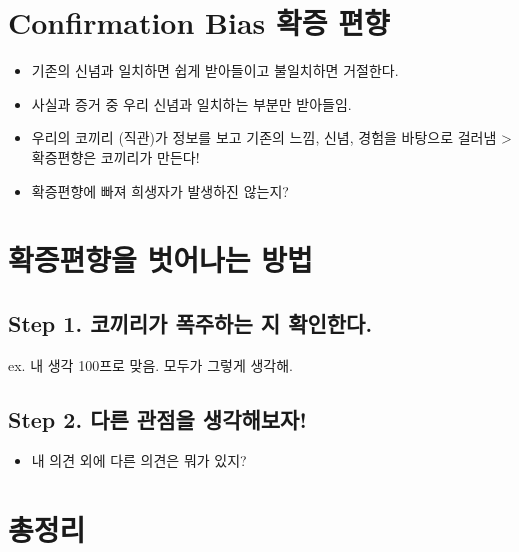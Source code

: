 \documentclass[
  letterpaper,
  DIV=11,
  numbers=noendperiod]{scrreprt}
\providecommand{\tightlist}{%
  \setlength{\itemsep}{0pt}\setlength{\parskip}{0pt}}\usepackage{longtable,booktabs,array}
\begin{document}
\hypertarget{confirmation-bias-uxd655uxc99d-uxd3b8uxd5a5}{%
\section{Confirmation Bias 확증
편향}\label{confirmation-bias-uxd655uxc99d-uxd3b8uxd5a5}}

\begin{itemize}
\tightlist
\item
  기존의 신념과 일치하면 쉽게 받아들이고 불일치하면 거절한다.
\item
  사실과 증거 중 우리 신념과 일치하는 부분만 받아들임.
\item
  우리의 코끼리 (직관)가 정보를 보고 기존의 느낌, 신념, 경험을 바탕으로
  걸러냄 \textgreater{} 확증편향은 코끼리가 만든다!
\item
  확증편향에 빠져 희생자가 발생하진 않는지?
\end{itemize}

\hypertarget{uxd655uxc99duxd3b8uxd5a5uxc744-uxbc97uxc5b4uxb098uxb294-uxbc29uxbc95}{%
\section{확증편향을 벗어나는
방법}\label{uxd655uxc99duxd3b8uxd5a5uxc744-uxbc97uxc5b4uxb098uxb294-uxbc29uxbc95}}

\hypertarget{step-1.-uxcf54uxb07cuxb9acuxac00-uxd3eduxc8fcuxd558uxb294-uxc9c0-uxd655uxc778uxd55cuxb2e4.}{%
\subsection{Step 1. 코끼리가 폭주하는 지
확인한다.}\label{step-1.-uxcf54uxb07cuxb9acuxac00-uxd3eduxc8fcuxd558uxb294-uxc9c0-uxd655uxc778uxd55cuxb2e4.}}

ex. 내 생각 100프로 맞음. 모두가 그렇게 생각해.

\hypertarget{step-2.-uxb2e4uxb978-uxad00uxc810uxc744-uxc0dduxac01uxd574uxbcf4uxc790}{%
\subsection{Step 2. 다른 관점을
생각해보자!}\label{step-2.-uxb2e4uxb978-uxad00uxc810uxc744-uxc0dduxac01uxd574uxbcf4uxc790}}

\begin{itemize}
\tightlist
\item
  내 의견 외에 다른 의견은 뭐가 있지?
\end{itemize}

\hypertarget{uxcd1duxc815uxb9ac}{%
\section{총정리}\label{uxcd1duxc815uxb9ac}}
\end{document}
